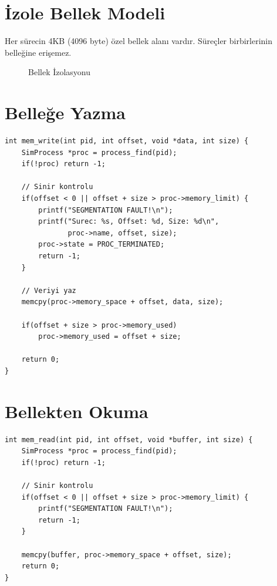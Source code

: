 \documentclass[12pt,a4paper]{report}
\begin{document}
\section{İzole Bellek Modeli}

Her sürecin 4KB (4096 byte) özel bellek alanı vardır. Süreçler birbirlerinin belleğine erişemez.

\begin{figure}[h]
\centering
{}
\caption{Bellek İzolasyonu}
\end{figure}

\section{Belleğe Yazma}

\begin{lstlisting}[caption={mem\_write Fonksiyonu}]
int mem_write(int pid, int offset, void *data, int size) {
    SimProcess *proc = process_find(pid);
    if(!proc) return -1;
    
    // Sinir kontrolu
    if(offset < 0 || offset + size > proc->memory_limit) {
        printf("SEGMENTATION FAULT!\n");
        printf("Surec: %s, Offset: %d, Size: %d\n",
               proc->name, offset, size);
        proc->state = PROC_TERMINATED;
        return -1;
    }
    
    // Veriyi yaz
    memcpy(proc->memory_space + offset, data, size);
    
    if(offset + size > proc->memory_used)
        proc->memory_used = offset + size;
    
    return 0;
}
\end{lstlisting}

\section{Bellekten Okuma}

\begin{lstlisting}[caption={mem\_read Fonksiyonu}]
int mem_read(int pid, int offset, void *buffer, int size) {
    SimProcess *proc = process_find(pid);
    if(!proc) return -1;
    
    // Sinir kontrolu
    if(offset < 0 || offset + size > proc->memory_limit) {
        printf("SEGMENTATION FAULT!\n");
        return -1;
    }
    
    memcpy(buffer, proc->memory_space + offset, size);
    return 0;
}
\end{lstlisting}
\end{document}
